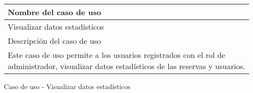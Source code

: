 \begin{identificacionCasoDeUso}
	\begin{tabular} { | p{17cm} |}

		\hline
		Nombre del caso de uso                                                                                                                     \\ \hline
		Visualizar datos estadísticos                                                                                                              \\ \hline
		Descripción del caso de uso                                                                                                                \\ \hline
		Este caso de uso permite a los usuarios registrados con el rol de administrador, visualizar datos estadísticos de las reservas y usuarios. \\ \hline
	\end{tabular}
	\caption{Caso de uso - Visualizar datos estadísticos}
\end{identificacionCasoDeUso}